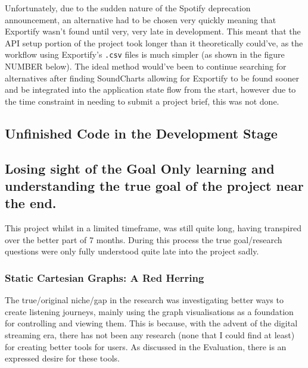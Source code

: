 Unfortunately, due to the sudden nature of the Spotify deprecation announcement, an alternative had to be chosen very quickly meaning that Exportify wasn't found until very, very late in development. This meant that the API setup portion of the project took longer than it theoretically could've, as the workflow using Exportify's \lstinline|.csv| files is much simpler (as shown in the figure NUMBER below). The ideal method would've been to continue searching for alternatives after finding SoundCharts allowing for Exportify to be found sooner and be integrated into the application state flow from the start, however due to the time constraint in needing to submit a project brief, this was not done.%

\subsection{Unfinished Code in the Development Stage}

\subsection{
    Losing sight of the Goal
    Only learning and understanding the true goal of the project near the end.
}%

This project whilst in a limited timeframe, was still quite long, having transpired over the better part of 7 months. During this process the true goal/research questions were only fully understood quite late into the project sadly.

\subsubsection{Static Cartesian Graphs: A Red Herring}
The true/original niche/gap in the research was investigating better ways to create listening journeys, mainly using the graph visualisations as a foundation for controlling and viewing them. This is because, with the advent of the digital streaming era, there has not been any research (none that I could find at least) for creating better tools for users. As discussed in the Evaluation, there is an expressed desire for these tools.

